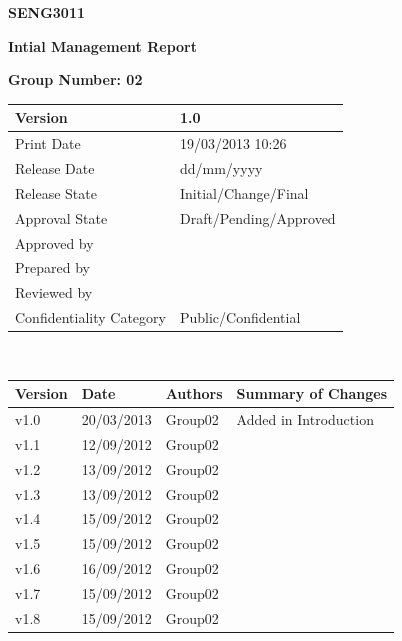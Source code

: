 \documentclass[a4paper]{article}
\begin{document}
\thispagestyle{empty}
\begin {center}
\Large\textbf{SENG3011} 

\Large\textbf{Intial Management Report}

\bigskip\Large\textbf{Group Number: 02}

\end{center}

\vspace*{16.5cm}
\begin{tabular}{|l|l|}
  \hline
  Version         & 1.0\\\hline
  Print Date      & 19/03/2013 10:26\\\hline
  Release Date    & dd/mm/yyyy\\\hline
  Release State   & Initial/Change/Final\\\hline
  Approval State  & Draft/Pending/Approved\\\hline
  Approved by     & \\\hline
  Prepared by     & \\\hline
  Reviewed by     & \\\hline
  Confidentiality Category  & Public/Confidential\\\hline
\end{tabular}
\pagebreak



\thispagestyle{plain}     %
\setcounter{page}{1}      %
\renewcommand{\thepage}{\roman{page}}  %

\\[2ex]
\begin{tabular}{|l|l|l|l|}
  \hline
  Version & Date & Authors & Summary of Changes\\\hline\hline
	v1.0 & 20/03/2013 & Group02 & Added in Introduction           	\\\hline
	v1.1 & 12/09/2012 & Group02 &  		\\\hline
	v1.2 & 13/09/2012 & Group02 &   		\\\hline
	v1.3 & 13/09/2012 & Group02 &   		\\\hline
	v1.4 & 15/09/2012 & Group02 &  		\\\hline
	v1.5 & 15/09/2012 & Group02 & 		\\\hline
	v1.6 & 16/09/2012 & Group02 &  		\\\hline
	v1.7 & 15/09/2012 & Group02 &  		\\\hline
	v1.8 & 15/09/2012 & Group02 &   		\\\hline
\end{tabular}
\end{document}
